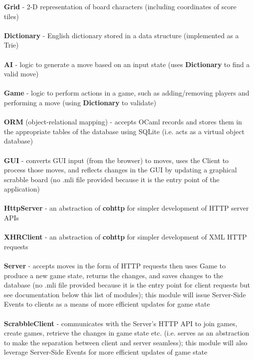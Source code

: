 \documentclass[2pt]{journal}
\begin{document}
\noindent
\textbf{Grid} - 2-D representation of board characters (including coordinates of score tiles) \\ \\
\textbf{Dictionary} - English dictionary stored in a data structure (implemented as a Trie) \\ \\
\textbf{AI} - logic to generate a move based on an input state (uses \textbf{Dictionary} to find a valid move) \\ \\
\textbf{Game} - logic to perform actions in a game, such as adding/removing players and performing a move (using \textbf{Dictionary} to validate) \\ \\
\textbf{ORM} (object-relational mapping) - accepts OCaml records and stores them in the appropriate tables of the database using SQLite (i.e. acts as a virtual object database) \\ \\
\textbf{GUI} - converts GUI input (from the browser) to moves, uses the Client to process those moves, and reflects changes in the GUI by updating a graphical scrabble board (no .mli file provided because it is the entry point of the application) \\ \\
\textbf{HttpServer} - an abstraction of \textbf{cohttp} for simpler development of HTTP server APIs \\ \\
\textbf{XHRClient} - an abstraction of \textbf{cohttp} for simpler development of XML HTTP requests \\ \\
\textbf{Server} - accepts moves in the form of HTTP requests then uses Game to produce a new game state, returns the changes, and saves changes to the database (no .mli file provided because it is the entry point for client requests but see documentation below this list of modules); this module will issue Server-Side Events to clients as a means of more efficient updates for game state \\ \\
\textbf{ScrabbleClient} - communicates with the Server's HTTP API to join games, create games, retrieve the changes in game state etc. (i.e. serves as an abstraction to make the separation between client and server seamless); this module will also leverage Server-Side Events for more efficient updates of game state \\ \\
\end{document}
